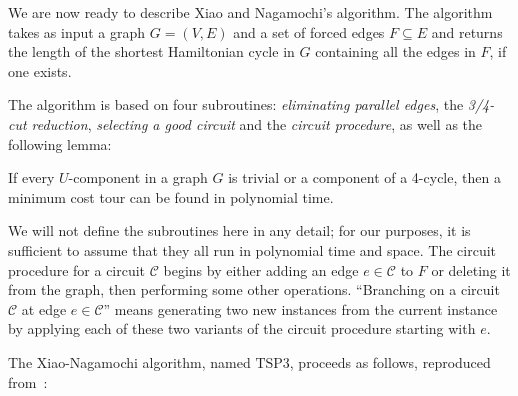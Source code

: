 


We are now ready to describe Xiao and Nagamochi's algorithm. The algorithm takes as input a graph $G = (V, E)$ and a set of forced edges $F \subseteq E$ and returns the length of the shortest Hamiltonian cycle in $G$ containing all the edges in $F$, if one exists.

The algorithm is based on four subroutines: {\em eliminating parallel edges}, the {\em 3/4-cut reduction}, {\em selecting a good circuit} and the {\em circuit procedure}, as well as the following lemma:

\begin{lemma}
\label{lem:trivial}
If every $U$-component in a graph $G$ is trivial or a component of a 4-cycle, then a minimum cost tour can be found in polynomial time.
\end{lemma}

We will not define the subroutines here in any detail; for our purposes, it is sufficient to assume that they all run in polynomial time and space. The circuit procedure for a circuit $\mathcal{C}$ begins by either adding an edge $e \in \mathcal{C}$ to $F$ or deleting it from the graph, then performing some other operations. ``Branching on a circuit $\mathcal{C}$ at edge $e \in \mathcal{C}$'' means generating two new instances from the current instance by applying each of these two variants of the circuit procedure starting with $e$.

The Xiao-Nagamochi algorithm, named $\text{TSP3}$, proceeds as follows, reproduced from~\cite{xiao2016degree3}:

